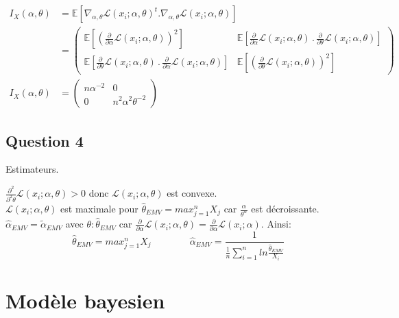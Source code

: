 \documentclass[
  12pt,
]{scrreprt}
\begin{document}
\[\begin{aligned}
&\\
I_X(\alpha,\theta)&=\mathbb{E}\left [\nabla_{\alpha,\theta}\mathcal{L}(x_i;\alpha,\theta)^t. \nabla_{\alpha,\theta}\mathcal{L}(x_i;\alpha,\theta)\right ]\\
&=\begin{pmatrix}
\mathbb{E}\left [ \left (\frac{\partial}{\partial \alpha}\mathcal{L}(x_i;\alpha,\theta)\right )^{2}\right ] & \mathbb{E}\left [ \frac{\partial}{\partial \alpha}\mathcal{L}(x_i;\alpha,\theta)\,.\,\frac{\partial}{\partial \theta}\mathcal{L}(x_i;\alpha,\theta)\right ]\\
\mathbb{E}\left [ \frac{\partial}{\partial \theta}\mathcal{L}(x_i;\alpha,\theta)\,.\,\frac{\partial}{\partial \alpha}\mathcal{L}(x_i;\alpha,\theta)\right ] & \mathbb{E}\left [ \left (\frac{\partial}{\partial \theta}\mathcal{L}(x_i;\alpha,\theta)\right )^{2}\right ]
\end{pmatrix}\\
I_X(\alpha,\theta)&=\begin{pmatrix}
n\alpha^{-2} & 0\\
0 & n^2\alpha^2\theta^{-2}
\end{pmatrix}
\end{aligned}\]

\newpage

\hypertarget{question-4}{%
\section{Question 4}\label{question-4}}

Estimateurs.

\(\frac{\partial^2}{\partial^2 \theta}\mathcal{L}(x_i;\alpha,\theta) > 0\) donc \(\mathcal{L}(x_i;\alpha,\theta)\) est convexe.\\
\(\mathcal{L}(x_i;\alpha,\theta)\) est maximale pour \(\hat{\theta}_{EMV} = max_{j=1}^n X_j\) car \(\frac{\alpha}{\theta^\alpha}\) est décroissante.\\
\(\hat{\alpha}_{EMV} = \tilde{\alpha}_{EMV}\) avec \(\theta : \hat{\theta}_{EMV}\) car \(\frac{\partial}{\partial \alpha}\mathcal{L}(x_i;\alpha,\theta) = \frac{\partial}{\partial \alpha}\mathcal{L}(x_i;\alpha)\). Ainsi:
\[\hat{\theta}_{EMV} =  max_{j=1}^n X_j \qquad\qquad \hat{\alpha}_{EMV} = \frac{1}{\frac{1}{n}\sum_{i=1}^n ln\frac{\hat{\theta}_{EMV}}{X_i}}\]

\hypertarget{moduxe8le-bayesien}{%
\chapter{Modèle bayesien}\label{moduxe8le-bayesien}}
\end{document}
